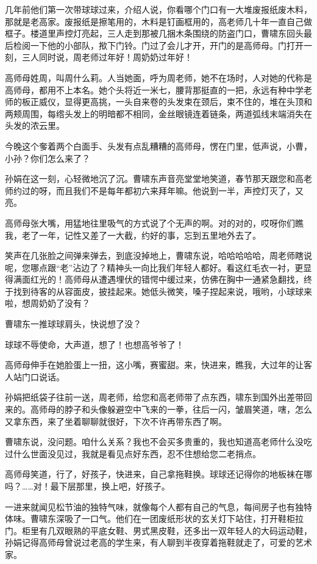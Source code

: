 \documentclass[lang=cn,newtx,12pt,scheme=chinese]{elegantbook}
\begin{document}
几年前他们第一次带球球过来，介绍人说，你看哪个门口有一大堆废报纸废木料，那就是老高家。废报纸是擦笔用的，木料是钉画框用的，高老师几十年一直自己做框子。楼道里声控灯亮起，三人走到那被几捆木条围绕的防盗门口，曹啸东回头最后检阅一下他的小部队，揿下门铃。门过了会儿才开，开门的是高师母。门打开一刻，三人同时说，周老师过年好！周奶奶过年好！

高师母姓周，叫周什么莉。人当她面，呼为周老师，她不在场时，人对她的代称是高师母，都用不上本名。她个头将近一米七，腰背那挺直的一把，永远有种中学老师的板正威仪，显得更高挑，一头自来卷的头发束在颈后，束不住的，堆在头顶和两颊周围，每绺头发上的明暗都不相同，金丝眼镜连着链条，两道弧线末端消失在头发的浓云里。

今晚这个奓着两个白面手、头发有点乱糟糟的高师母，愣在门里，低声说，小曹，小孙？你们怎么来了？

孙娟在这一刻，心轻微地沉了沉。曹啸东声音亮堂堂地笑道，春节那天跟您和高老师约过的呀，而且我们不是每年都初六来拜年嘛。他说到一半，声控灯灭了，又亮。

高师母张大嘴，用猛地往里吸气的方式说了个无声的啊。对的对的，哎呀你们瞧我，老了一年，记性又差了一大截，约好的事，忘到五里地外去了。

笑声在几张脸之间弹来弹去，到底没掉地上，曹啸东说，哈哈哈哈哈，周老师瞎说呢，您哪点跟“老”沾边了？精神头一向比我们年轻人都好。看这红毛衣一衬，更显得满面红光的！高师母从遭遇埋伏的错愕中缓过来，仿佛在胸中一通紧急翻找，终于找到待客的从容面皮，披挂起来。她低头微笑，嗓子捏起来说，哦哟，小球球来啦，想周奶奶了没有？

曹啸东一推球球肩头，快说想了没？

球球不辱使命，大声道，想了！也想高爷爷了！

高师母伸手在她脸蛋上一扭，这小嘴，赛蜜甜。来，快进来，瞧我，大过年的让客人站门口说话。

孙娟把纸袋子往前一送，周老师，给您和高老师带了点东西，啸东到国外出差带回来的。高师母的脖子和头像躲避空中飞来的一拳，往后一闪，皱眉笑道，嗐，怎么又拿东西，来了坐着聊聊就很好，下次不许再带东西了啊。

曹啸东说，没问题。咱什么关系？我也不会买多贵重的，我也知道高老师什么没吃过什么世面没见过，我就是看见点好东西，忍不住想给您二老捎点。

高师母笑道，行了，好孩子，快进来，自己拿拖鞋换。球球还记得你的地板袜在哪吗？……对！最下层那里，换上吧，好孩子。

一进来就闻见松节油的独特气味，就像每个人都有自己的气息，每间房子也有独特体味。曹啸东深吸了一口气。他们在一团废纸形状的玄关灯下站住，打开鞋柜拉门。柜里有几双眼熟的平底女鞋、男式黑皮鞋，还多出一双年轻人的大码运动鞋，孙娟记得高师母曾说过老高的学生来，有人聊到半夜穿着拖鞋就走了，可爱的艺术家。
\end{document}
